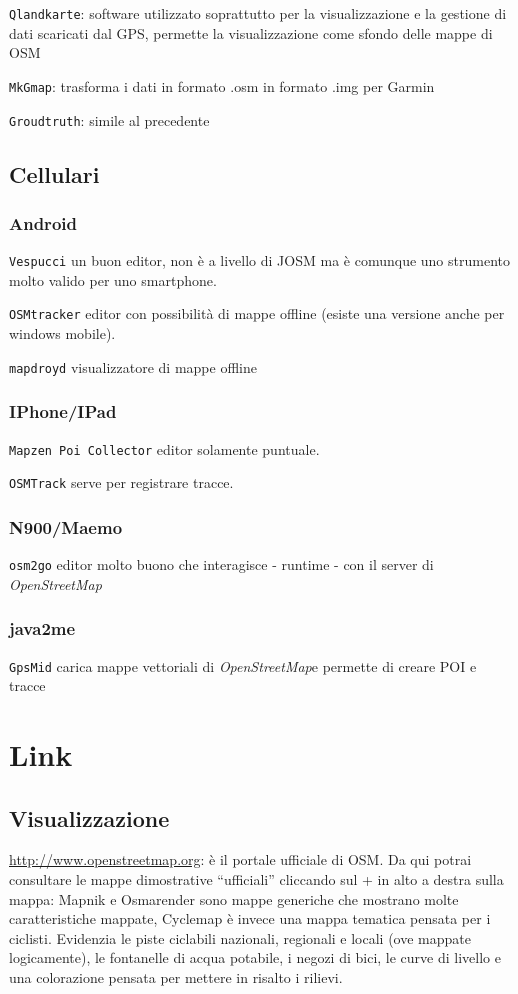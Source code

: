 \documentclass[a4paper,twoside,12pt,]{article}
\newcommand{\osm}{\emph{OpenStreetMap\xspace}}
\newcommand{\gps}{GPS\xspace}
\begin{document}
\texttt{Qlandkarte}: software utilizzato soprattutto per la visualizzazione e la gestione di dati scaricati dal \gps, permette la visualizzazione come sfondo delle mappe di OSM

\texttt{MkGmap}: trasforma i dati in formato .osm in formato .img per Garmin

\texttt{Groudtruth}: simile al precedente

\subsection{Cellulari}
\subsubsection{Android}

\texttt{Vespucci} un buon editor, non è a livello di JOSM ma è comunque uno strumento molto valido per uno smartphone. 

\texttt{OSMtracker} editor con possibilità di mappe offline (esiste una versione anche per windows mobile).

\texttt{mapdroyd} visualizzatore di mappe offline
\subsubsection{IPhone/IPad}

\texttt{Mapzen Poi Collector} editor solamente puntuale.

\texttt{OSMTrack} serve per registrare tracce.
\subsubsection{N900/Maemo}

\texttt{osm2go} editor molto buono che interagisce - runtime - con il server di \osm
\subsubsection{java2me}

\texttt{GpsMid} carica mappe vettoriali di \osm e permette di creare POI e tracce

\section{Link}
\subsection{Visualizzazione}
\url{http://www.openstreetmap.org}: è il portale ufficiale di OSM. Da qui potrai consultare le mappe dimostrative “ufficiali” cliccando sul + in alto a destra sulla mappa:
Mapnik e Osmarender sono mappe generiche che mostrano molte caratteristiche mappate,
Cyclemap è invece una mappa tematica pensata per i ciclisti. Evidenzia le piste ciclabili nazionali, regionali e locali (ove mappate logicamente), le fontanelle di acqua potabile, i negozi di bici, le curve di livello e una colorazione pensata per mettere in risalto i rilievi.
\end{document}
